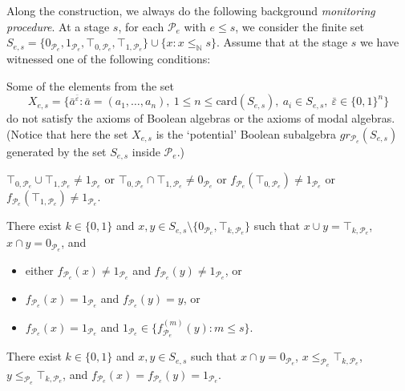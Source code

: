 \documentclass[a4paper,UKenglish,cleveref, autoref, thm-restate]{lipics-v2021}
\begin{document}
Along the construction, we always do the following background \emph{monitoring procedure}. At a stage $s$, for each $\mathcal{P}_e$ with $e\leq s$, we consider the finite set 
$
	S_{e,s} = \{ 0_{\mathcal{P}_e}, 1_{\mathcal{P}_e}, \top_{0,\mathcal{P}_e}, \top_{1,\mathcal{P}_e}\} \cup \{ x : x\leq_{\mathbb{N}} s\}.
$ 
Assume that at the stage $s$ we have witnessed one of the following conditions:
\begin{alphaenumerate}
	\item Some of the elements from the set 
	\[
		X_{e,s} = \big\{ \bar a^{\bar \varepsilon} : \bar a = (a_1,\dots,a_n),\ 1\leq n \leq \mathrm{card}(S_{e,s}),\ a_i \in S_{e,s},\ \bar\varepsilon \in \{0,1\}^n
		\big\}
	\] 
	do not satisfy the axioms of Boolean algebras or the axioms of modal algebras. (Notice that here the set $X_{e,s}$ is the `potential' Boolean subalgebra $gr_{\mathcal{P}_e}(S_{e,s})$ generated by the set $S_{e,s}$ inside $\mathcal{P}_e$.)
	
	\item $\top_{0,\mathcal{P}_e} \cup \top_{1,\mathcal{P}_e} \neq 1_{\mathcal{P}_e}$ or $\top_{0,\mathcal{P}_e} \cap \top_{1,\mathcal{P}_e} \neq 0_{\mathcal{P}_e}$ or $f_{\mathcal{P}_e}(\top_{0,\mathcal{P}_e}) \neq 1_{\mathcal{P}_e}$ or $f_{\mathcal{P}_e}(\top_{1,\mathcal{P}_e}) \neq 1_{\mathcal{P}_e}$.
	
	\item There exist $k\in\{ 0,1\}$ and $x,y\in S_{e,s} \setminus\{ 0_{\mathcal{P}_e}, \top_{k,\mathcal{P}_e}\}$ such that $x\cup y = \top_{k,\mathcal{P}_e}$, $x\cap y = 0_{\mathcal{P}_e}$, and 
	\begin{itemize}
		\item either $f_{\mathcal{P}_e}(x) \neq 1_{\mathcal{P}_e}$ and $f_{\mathcal{P}_e}(y)\neq 1_{\mathcal{P}_e}$, or
		
		\item $f_{\mathcal{P}_e}(x) = 1_{\mathcal{P}_e}$ and $f_{\mathcal{P}_e}(y) = y$, or
		
		\item $f_{\mathcal{P}_e}(x) = 1_{\mathcal{P}_e}$ and $1_{\mathcal{P}_e} \in  \{ f^{(m)}_{\mathcal{P}_e}(y) : m\leq s \}$.
	\end{itemize}
	
	\item There exist $k\in\{ 0,1\}$ and $x,y \in S_{e,s}$ such that $x\cap y = 0_{\mathcal{P}_e}$, $x\leq_{\mathcal{P}_e}\! \top_{k,\mathcal{P}_e}$, $y\leq_{\mathcal{P}_e}\! \top_{k,\mathcal{P}_e}$, and $f_{\mathcal{P}_e}(x) = f_{\mathcal{P}_e}(y) = 1_{\mathcal{P}_e}$.
\end{alphaenumerate}
\end{document}

